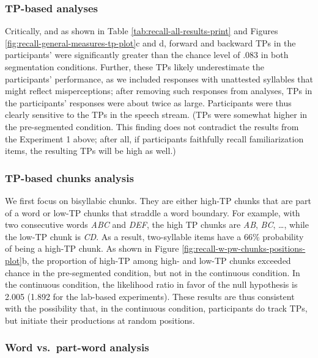 \documentclass[
]{article}
\begin{document}
\subsubsection{TP-based analyses}\label{tp-based-analyses}

Critically, and as shown in Table \ref{tab:recall-all-results-print} and
Figures \ref{fig:recall-general-measures-tp-plot}c and d, forward and
backward TPs in the participants' were significantly greater than the
chance level of \(.083\) in both segmentation conditions. Further, these
TPs likely underestimate the participants' performance, as we included
responses with unattested syllables that might reflect misperceptions;
after removing such responses from analyses, TPs in the participants'
responses were about twice as large. Participants were thus clearly
sensitive to the TPs in the speech stream. (TPs were somewhat higher in
the pre-segmented condition. This finding does not contradict the
results from the Experiment 1 above; after all, if participants
faithfully recall familiarization items, the resulting TPs will be high
as well.)

\subsubsection{TP-based chunks analysis}\label{tp-based-chunks-analysis}

We first focus on bisyllabic chunks. They are either high-TP chunks that
are part of a word or low-TP chunks that straddle a word boundary. For
example, with two consecutive words \emph{ABC} and \emph{DEF}, the high
TP chunks are \emph{AB}, \emph{BC}, \ldots, while the low-TP chunk is
\emph{CD}. As a result, two-syllable items have a 66\% probability of
being a high-TP chunk. As shown in Figure
\ref{fig:recall-w-pw-chunks-positions-plot}b, the proportion of high-TP
among high- and low-TP chunks exceeded chance in the pre-segmented
condition, but not in the continuous condition. In the continuous
condition, the likelihood ratio in favor of the null hypothesis is 2.005
(1.892 for the lab-based experiments). These results are thus consistent
with the possibility that, in the continuous condition, participants do
track TPs, but initiate their productions at random positions.

\subsubsection{Word vs.~part-word
analysis}\label{word-vs.-part-word-analysis}
\end{document}
